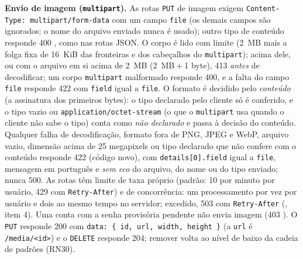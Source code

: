 \textbf{Envio de imagem (\texttt{multipart}).} As rotas \texttt{PUT} de imagem exigem \texttt{Content-Type: multipart/form-data} com um campo \texttt{file} (os demais campos são ignorados; o nome do arquivo enviado nunca é usado); outro tipo de conteúdo responde 400 , como nas rotas JSON. O corpo é lido com limite (2~MB mais a folga fixa de 16~KiB das fronteiras e dos cabeçalhos do \texttt{multipart}); acima dele, ou com o arquivo em si acima de 2~MB (2~MB${}+{}$1 byte), 413  \emph{antes} de decodificar; um corpo \texttt{multipart} malformado responde 400, e a falta do campo \texttt{file} responde 422  com \texttt{field} igual a \texttt{file}. O formato é decidido pelo \emph{conteúdo} (a assinatura dos primeiros bytes): o tipo declarado pelo cliente só é conferido, e o tipo vazio ou \texttt{application/octet-stream} (o que o \texttt{multipart} usa quando o cliente não sabe o tipo) conta como \emph{não declarado} e passa à decisão do conteúdo. Qualquer falha de decodificação, formato fora de PNG, JPEG e WebP, arquivo vazio, dimensão acima de 25 megapixels ou tipo declarado que não confere com o conteúdo responde 422  (código novo), com \texttt{details[0].field} igual a \texttt{file}, mensagem em português e \emph{sem eco} do arquivo, do nome ou do tipo enviado; nunca 500. As rotas têm limite de taxa próprio (padrão: 10 por minuto por usuário, 429  com \texttt{Retry-After}) e de concorrência: um processamento por vez por usuário e dois ao mesmo tempo no servidor; excedido, 503  com \texttt{Retry-After} (, item 4). Uma conta com a senha provisória pendente não envia imagem (403 ). O \texttt{PUT} responde 200 com \texttt{data: \{ id, url, width, height \}} (a \texttt{url} é \texttt{/media/<id>}) e o \texttt{DELETE} responde 204; remover volta ao nível de baixo da cadeia de padrões (RN30).

